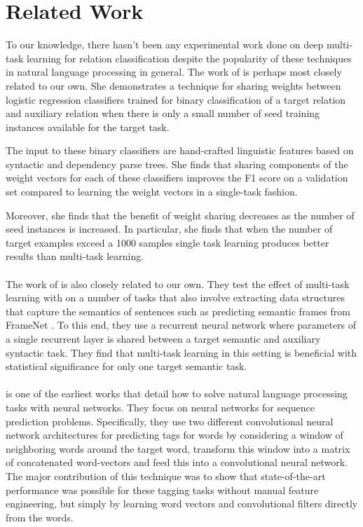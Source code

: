\section{Related Work}
To our knowledge, there hasn't been any experimental work done on deep multi-task learning for relation classification despite the popularity of these techniques in natural language processing in general. The work of \citet{jiang2009} is perhaps most closely related to our own. She demonstrates a technique for sharing weights between logistic regression classifiers trained for binary classification of a target relation and auxiliary relation when there is only a small number of seed training instances available for the target task. 

The input to these binary classifiers are hand-crafted linguistic features based on syntactic and dependency parse trees. She finds that sharing components of the weight vectors for each of these classifiers improves the F1 score on a validation set compared to learning the weight vectors in a single-task fashion.

Moreover, she finds that the benefit of weight sharing decreases as the number of seed instances is increased. In particular, she finds that when the number of target examples exceed a 1000 samples single task learning produces better results than multi-task learning.
\\\\
The work of \citet{alonso2016} is also closely related to our own. They test the effect of multi-task learning with on a number of tasks that also involve extracting data structures that capture the semantics of sentences such as predicting semantic frames from FrameNet \cite{baker1998}. To this end, they use a recurrent neural network where parameters of a single recurrent layer is shared between a target semantic and auxiliary syntactic task. They find that multi-task learning in this setting is beneficial with statistical significance for only one target semantic task.
\\\\
\citet{collobert2011} is one of the earliest works that detail how to solve natural language processing tasks with neural networks. They focus on neural networks for sequence prediction problems. Specifically, they use two different convolutional neural network architectures for predicting tags for words by considering a window of neighboring words around the target word, transform this window into a matrix of concatenated word-vectors and feed this into a convolutional neural network. The major contribution of this technique was to show that state-of-the-art performance was possible for these tagging tasks without manual feature engineering, but simply by learning word vectors and convolutional filters directly from the words.


